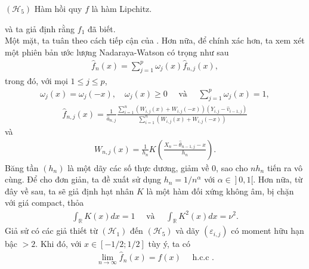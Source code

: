 $\left(\mathcal{H}_{5}\right)$ Hàm hồi quy $f$ là hàm Lipchitz.

\noindent và ta giả định rằng $f_{1}$ đã biết.\\
Một mặt, ta tuân theo cách tiếp cận của \cite{bercu}. Hơn nữa, để chính xác hơn, ta xem xét một phiên bản ước lượng Nadaraya-Watson có trọng như sau
\begin{align}
    \widehat{f}_{n}(x)=\sum_{j=1}^{p} \omega_{j}(x) \widehat{f}_{n, j}(x),
    \label{6.1}
\end{align}
trong đó, với mọi $1 \leq j \leq p$,
\begin{align}
    \omega_{j}(x)=\omega_{j}(-x), \quad \omega_{j}(x) \geq 0 \quad \text { và } \quad \sum_{j=1}^{p} \omega_{j}(x)=1,
    \label{6.2}
\end{align}
\begin{align}
    \widehat{f}_{n, j}(x)=\frac{1}{\widehat{a}_{n, j}} \frac{\sum_{i=1}^{n}\left(W_{i, j}(x)+W_{i, j}(-x)\right)\left(Y_{i, j}-\widehat{v}_{i-1, j}\right)}{\sum_{i=1}^{n}\left(W_{i, j}(x)+W_{i, j}(-x)\right)}
    \label{6.3}
\end{align}
và
\begin{align}
W_{n, j}(x)=\frac{1}{h_{n}} K\left(\frac{X_{n}-\widehat{\theta}_{n-1, j}-x}{h_{n}}\right).
\end{align}
Băng tần $\left(h_{n}\right)$ là một dãy các số thực dương, giảm về $0$, sao cho $n h_{n}$ tiến ra vô cùng. Để cho đơn giản, ta đề xuất sử dụng $h_{n}=1 / n^{\alpha}$ với $\left.\alpha \in\right] 0,1[$. Hơn nữa, từ đây về sau, ta sẽ giả định hạt nhân $K$ là một hàm đối xứng không âm, bị chặn với giá compact, thỏa
\begin{align}
    \int_{\mathbb{R}} K(x) d x=1 \quad \text { và } \quad \int_{\mathbb{R}} K^{2}(x) d x=\nu^{2}.
    \label{6.5}
\end{align}
{\dl \label{dl6.1}Giả sử có các giả thiết từ $\left(\mathcal{H}_{1}\right)$ đến $\left(\mathcal{H}_{5}\right)$ và dãy $\left(\varepsilon_{i, j}\right)$ có moment hữu hạn bậc $>2$. Khi đó, với $x \in[-1 / 2 ; 1 / 2]$ tùy ý, ta có
\begin{align}
    \lim _{n \rightarrow \infty} \widehat{f}_{n}(x)=f(x) \quad \text { h.c.c .}
    \label{9.4}
\end{align}
} 
